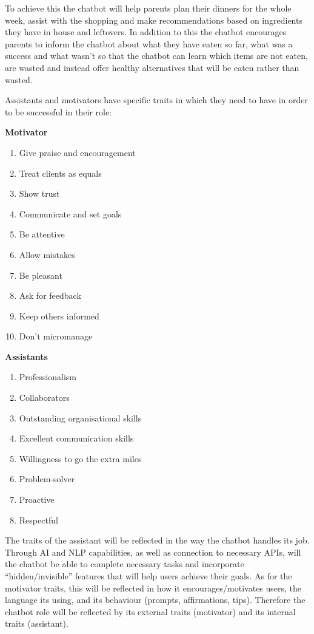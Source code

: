     To achieve this the chatbot will help parents plan their dinners for the whole week, assist with the shopping and make recommendations based on ingredients they have in house and leftovers. In addition to this the chatbot encourages parents to inform the chatbot about what they have eaten so far, what was a success and what wasn’t so that the chatbot can learn which items are not eaten, are wasted and instead offer healthy alternatives that will be eaten rather than wasted. 
    
    Assistants and motivators have specific traits in which they need to have in order to be successful in their role:
    
\vspace{2,5mm}
    
    \textbf{Motivator}
    \begin{enumerate}
        \item Give praise and encouragement
        \item Treat clients as equals
        \item Show trust
        \item Communicate and set goals
        \item Be attentive
        \item Allow mistakes
        \item Be pleasant 
        \item Ask for feedback
        \item Keep others informed
        \item Don’t micromanage
    \end{enumerate}
    
    \textbf{Assistants}
    \begin{enumerate}
        \item Professionalism
        \item Collaborators
        \item Outstanding organisational skills
        \item Excellent communication skills
        \item Willingness to go the extra miles
        \item Problem-solver
        \item Proactive
        \item Respectful
    \end{enumerate}
    
 
    The traits of the assistant will be reflected in the way the chatbot handles its job. Through AI and NLP capabilities, as well as connection to necessary APIs, will the chatbot be able to complete necessary tasks and incorporate “hidden/invisible” features that will help users achieve their goals. As for the motivator traits, this will be reflected in how it encourages/motivates users, the language its using, and its behaviour (prompts, affirmations, tips). Therefore the chatbot role will be reflected by its external traits (motivator) and its internal traits (assistant).
    
